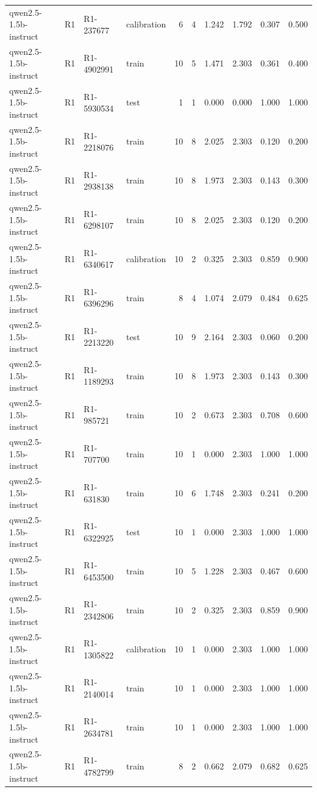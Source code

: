 \begin{table}
\begin{tabular}{llllrrrrrr}
qwen2.5-1.5b-instruct & R1 & R1-237677 & calibration & 6 & 4 & 1.242 & 1.792 & 0.307 & 0.500 \\
qwen2.5-1.5b-instruct & R1 & R1-4902991 & train & 10 & 5 & 1.471 & 2.303 & 0.361 & 0.400 \\
qwen2.5-1.5b-instruct & R1 & R1-5930534 & test & 1 & 1 & 0.000 & 0.000 & 1.000 & 1.000 \\
qwen2.5-1.5b-instruct & R1 & R1-2218076 & train & 10 & 8 & 2.025 & 2.303 & 0.120 & 0.200 \\
qwen2.5-1.5b-instruct & R1 & R1-2938138 & train & 10 & 8 & 1.973 & 2.303 & 0.143 & 0.300 \\
qwen2.5-1.5b-instruct & R1 & R1-6298107 & train & 10 & 8 & 2.025 & 2.303 & 0.120 & 0.200 \\
qwen2.5-1.5b-instruct & R1 & R1-6340617 & calibration & 10 & 2 & 0.325 & 2.303 & 0.859 & 0.900 \\
qwen2.5-1.5b-instruct & R1 & R1-6396296 & train & 8 & 4 & 1.074 & 2.079 & 0.484 & 0.625 \\
qwen2.5-1.5b-instruct & R1 & R1-2213220 & test & 10 & 9 & 2.164 & 2.303 & 0.060 & 0.200 \\
qwen2.5-1.5b-instruct & R1 & R1-1189293 & train & 10 & 8 & 1.973 & 2.303 & 0.143 & 0.300 \\
qwen2.5-1.5b-instruct & R1 & R1-985721 & train & 10 & 2 & 0.673 & 2.303 & 0.708 & 0.600 \\
qwen2.5-1.5b-instruct & R1 & R1-707700 & train & 10 & 1 & 0.000 & 2.303 & 1.000 & 1.000 \\
qwen2.5-1.5b-instruct & R1 & R1-631830 & train & 10 & 6 & 1.748 & 2.303 & 0.241 & 0.200 \\
qwen2.5-1.5b-instruct & R1 & R1-6322925 & test & 10 & 1 & 0.000 & 2.303 & 1.000 & 1.000 \\
qwen2.5-1.5b-instruct & R1 & R1-6453500 & train & 10 & 5 & 1.228 & 2.303 & 0.467 & 0.600 \\
qwen2.5-1.5b-instruct & R1 & R1-2342806 & train & 10 & 2 & 0.325 & 2.303 & 0.859 & 0.900 \\
qwen2.5-1.5b-instruct & R1 & R1-1305822 & calibration & 10 & 1 & 0.000 & 2.303 & 1.000 & 1.000 \\
qwen2.5-1.5b-instruct & R1 & R1-2140014 & train & 10 & 1 & 0.000 & 2.303 & 1.000 & 1.000 \\
qwen2.5-1.5b-instruct & R1 & R1-2634781 & train & 10 & 1 & 0.000 & 2.303 & 1.000 & 1.000 \\
qwen2.5-1.5b-instruct & R1 & R1-4782799 & train & 8 & 2 & 0.662 & 2.079 & 0.682 & 0.625 \\

\end{tabular}
\end{table}
